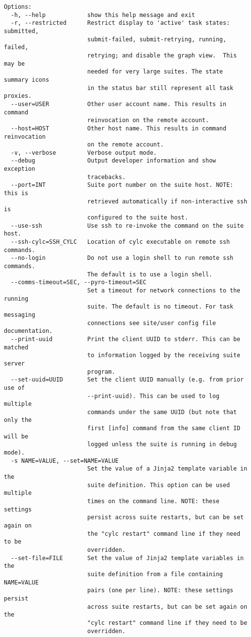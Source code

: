 \begin{lstlisting}
Options:
  -h, --help            show this help message and exit
  -r, --restricted      Restrict display to 'active' task states: submitted,
                        submit-failed, submit-retrying, running, failed,
                        retrying; and disable the graph view.  This may be
                        needed for very large suites. The state summary icons
                        in the status bar still represent all task proxies.
  --user=USER           Other user account name. This results in command
                        reinvocation on the remote account.
  --host=HOST           Other host name. This results in command reinvocation
                        on the remote account.
  -v, --verbose         Verbose output mode.
  --debug               Output developer information and show exception
                        tracebacks.
  --port=INT            Suite port number on the suite host. NOTE: this is
                        retrieved automatically if non-interactive ssh is
                        configured to the suite host.
  --use-ssh             Use ssh to re-invoke the command on the suite host.
  --ssh-cylc=SSH_CYLC   Location of cylc executable on remote ssh commands.
  --no-login            Do not use a login shell to run remote ssh commands.
                        The default is to use a login shell.
  --comms-timeout=SEC, --pyro-timeout=SEC
                        Set a timeout for network connections to the running
                        suite. The default is no timeout. For task messaging
                        connections see site/user config file documentation.
  --print-uuid          Print the client UUID to stderr. This can be matched
                        to information logged by the receiving suite server
                        program.
  --set-uuid=UUID       Set the client UUID manually (e.g. from prior use of
                        --print-uuid). This can be used to log multiple
                        commands under the same UUID (but note that only the
                        first [info] command from the same client ID will be
                        logged unless the suite is running in debug mode).
  -s NAME=VALUE, --set=NAME=VALUE
                        Set the value of a Jinja2 template variable in the
                        suite definition. This option can be used multiple
                        times on the command line. NOTE: these settings
                        persist across suite restarts, but can be set again on
                        the "cylc restart" command line if they need to be
                        overridden.
  --set-file=FILE       Set the value of Jinja2 template variables in the
                        suite definition from a file containing NAME=VALUE
                        pairs (one per line). NOTE: these settings persist
                        across suite restarts, but can be set again on the
                        "cylc restart" command line if they need to be
                        overridden.
\end{lstlisting}
